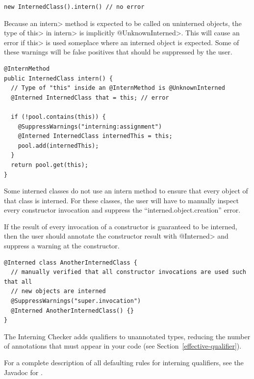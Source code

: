 \begin{Verbatim}
new InternedClass().intern() // no error
\end{Verbatim}

Because an \<intern> method is expected to be called on uninterned objects, the
type of \<this> in \<intern> is implicitly \<@UnknownInterned>. This will cause an
error if \<this> is used someplace where an interned object is expected.  Some
of these warnings will be false positives that should be suppressed by the
user.

\begin{Verbatim}
@InternMethod
public InternedClass intern() {
  // Type of "this" inside an @InternMethod is @UnknownInterned
  @Interned InternedClass that = this; // error

  if (!pool.contains(this)) {
    @SuppressWarnings("interning:assignment")
    @Interned InternedClass internedThis = this;
    pool.add(internedThis);
  }
  return pool.get(this);
}
\end{Verbatim}

Some interned classes do not use an intern method to ensure that every object
of that class is interned.  For these classes, the user will have to manually
inspect every constructor invocation and suppress the ``interned.object.creation''
error.

If the result of every invocation of a constructor is guaranteed to be interned, then the
user should annotate the constructor result with \<@Interned> and suppress a
warning at the constructor.

\begin{Verbatim}
@Interned class AnotherInternedClass {
  // manually verified that all constructor invocations are used such that all
  // new objects are interned
  @SuppressWarnings("super.invocation")
  @Interned AnotherInternedClass() {}
}
\end{Verbatim}



The Interning Checker
adds qualifiers to unannotated types, reducing the number of annotations that must
appear in your code (see Section~\ref{effective-qualifier}).

For a complete description of all defaulting rules for interning qualifiers, see the
Javadoc for .


